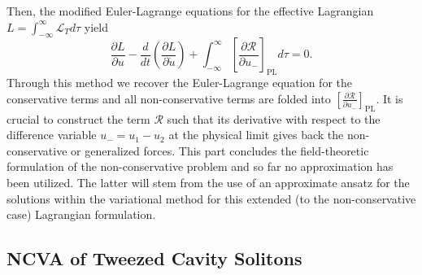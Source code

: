 \documentclass[aps,floatfix,showpacs,preprintnumbers,twocolumn,nofootinbib]{revtex4}
\begin{document}
%
Then, the modified Euler-Lagrange equations for the effective Lagrangian $L = \int_{-\infty}^\infty \mathcal{L}_T d\tau$ yield
%
\begin{equation}
\frac{\partial L}{\partial u} - \frac{d}{dt}\left( \frac{\partial L}{\partial \dot{u}} \right) + \int_{-\infty}^\infty \left[ \frac{\partial \mathcal{R}}{\partial u_- }\right]_{\mathrm{PL}} d\tau = 0. 
\label{NCVAODE}
\end{equation}
%
Through this method we recover the Euler-Lagrange equation for the conservative terms and all non-conservative terms are folded into $[ \frac{\partial \mathcal{R}}{\partial u_-} ]_{\mathrm{PL}}$.  
It is crucial to construct the term $\mathcal{R}$ such that its derivative with respect to the difference variable $u_-=u_1-u_2$ at the physical limit gives back the non-conservative or generalized forces. This part concludes
the field-theoretic formulation of the non-conservative problem and
so far no approximation has been utilized. The latter
will stem from the use of an approximate ansatz for
the solutions within the variational method
for this extended (to the non-conservative case) Lagrangian formulation.
%

\subsection{NCVA of Tweezed Cavity Solitons}
 \label{section:TweezeNCVA}
\end{document}
